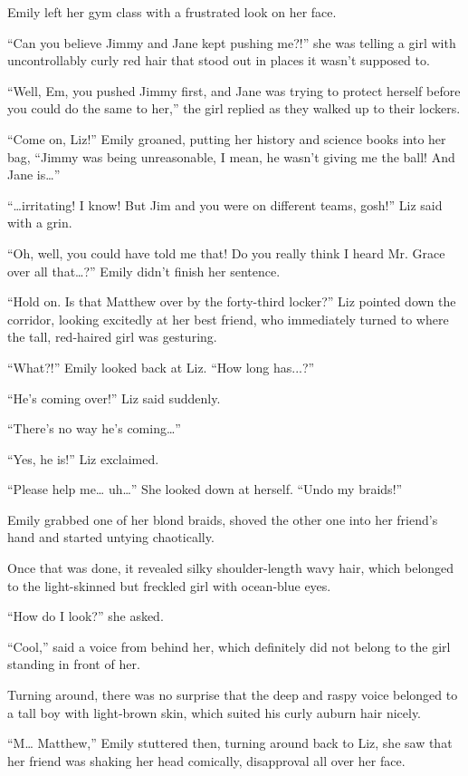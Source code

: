 Emily left her gym class with a frustrated look on her face.

“Can you believe Jimmy and Jane kept pushing me?!” she was telling a girl with uncontrollably curly red hair that stood out in places it wasn't supposed to.

“Well, Em, you pushed Jimmy first, and Jane was trying to protect herself before you could do the same to her,” the girl replied as they walked up to their lockers.

“Come on, Liz!” Emily groaned, putting her history and science books into her bag, “Jimmy was being unreasonable, I mean, he wasn't giving me the ball! And Jane is…”

“…irritating! I know! But Jim and you were on different teams, gosh!” Liz said with a grin.

“Oh, well, you could have told me that! Do you really think I heard Mr. Grace over all that…?” Emily didn't finish her sentence.

“Hold on. Is that Matthew over by the forty-third locker?” Liz pointed down the corridor, looking excitedly at her best friend, who immediately turned to where the tall, red-haired girl was gesturing.

“What?!” Emily looked back at Liz. “How long has...?”

“He's coming over!” Liz said suddenly.

“There's no way he's coming…”

“Yes, he is!” Liz exclaimed.

“Please help me… uh…” She looked down at herself. “Undo my braids!”

Emily grabbed one of her blond braids, shoved the other one into her friend's hand and started untying chaotically.

Once that was done, it revealed silky shoulder-length wavy hair, which belonged to the light-skinned but freckled girl with ocean-blue eyes.

“How do I look?” she asked.

“Cool,” said a voice from behind her, which definitely did not belong to the girl standing in front of her.

Turning around, there was no surprise that the deep and raspy voice belonged to a tall boy with light-brown skin, which suited his curly auburn hair nicely.

“M… Matthew,” Emily stuttered then, turning around back to Liz, she saw that her friend was shaking her head comically, disapproval all over her face.

